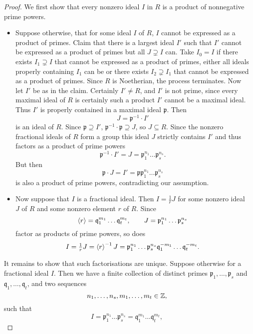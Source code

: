 \begin{proof}
We first show that every nonzero ideal $ I $ in $ R $ is a product of nonnegative prime powers.
\begin{itemize}
\item Suppose otherwise, that for some ideal $ I $ of $ R $, $ I $ cannot be expressed as a product of primes. Claim that there is a largest ideal $ I' $ such that $ I' $ cannot be expressed as a product of primes but all $ J \supsetneq I $ can. Take $ I_0 = I $ if there exists $ I_1 \supsetneq I $ that cannot be expressed as a product of primes, either all ideals properly containing $ I_1 $ can be or there exists $ I_2 \supsetneq I_1 $ that cannot be expressed as a product of primes. Since $ R $ is Noetherian, the process terminates. Now let $ I' $ be as in the claim. Certainly $ I' \ne R $, and $ I' $ is not prime, since every maximal ideal of $ R $ is certainly such a product $ I' $ cannot be a maximal ideal. Thus $ I' $ is properly contained in a maximal ideal $ \mathfrak{p} $. Then
$$ J = \mathfrak{p}^{-1} \cdot I' $$
is an ideal of $ R $. Since $ \mathfrak{p} \supseteq I' $, $ \mathfrak{p}^{-1} \cdot \mathfrak{p} \supseteq J $, so $ J \subseteq R $. Since the nonzero fractional ideals of $ R $ form a group this ideal $ J $ strictly contains $ I' $ and thus factors as a product of prime powers
$$ \mathfrak{p}^{-1} \cdot I' = J = \mathfrak{p}_1^{n_1} \dots \mathfrak{p}_s^{n_s}. $$
But then
$$ \mathfrak{p} \cdot J = I' = \mathfrak{p}\mathfrak{p}_1^{n_1} \dots \mathfrak{p}_s^{n_s} $$
is also a product of prime powers, contradicting our assumption.
\item Now suppose that $ I $ is a fractional ideal. Then $ I = \tfrac{1}{r}J $ for some nonzero ideal $ J $ of $ R $ and some nonzero element $ r $ of $ R $. Since
$$ \left\langle r \right\rangle = \mathfrak{q}_1^{m_1} \dots \mathfrak{q}_t^{m_t}, \qquad J = \mathfrak{p}_1^{n_1} \dots \mathfrak{p}_s^{n_s} $$
factor as products of prime powers, so does
$$ I = \tfrac{1}{r}J = \left\langle r \right\rangle^{-1}J = \mathfrak{p}_1^{n_1} \dots \mathfrak{p}_s^{n_s}\mathfrak{q}_1^{-m_1} \dots \mathfrak{q}_t^{-m_t}. $$
\end{itemize}
It remains to show that such factorisations are unique. Suppose otherwise for a fractional ideal $ I $. Then we have a finite collection of distinct primes $ \mathfrak{p}_1, \dots, \mathfrak{p}_s $ and $ \mathfrak{q}_1, \dots, \mathfrak{q}_t $, and two sequences
$$ n_1, \dots, n_s, m_1, \dots, m_t \in \mathbb{Z}, $$
such that
$$ I = \mathfrak{p}_1^{n_1} \dots \mathfrak{p}_s^{n_s} = \mathfrak{q}_1^{m_1} \dots \mathfrak{q}_t^{m_t}, $$

\end{proof}
